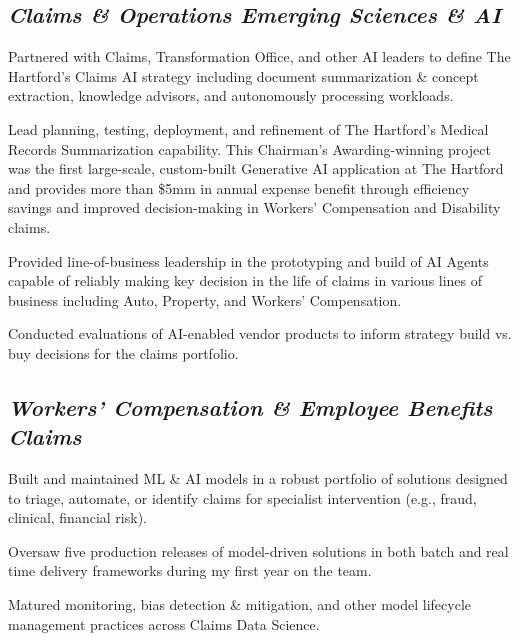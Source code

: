 \documentclass[letterpaper]{deedy-resume} %
\begin{document}
\begin{minipage}[t]{0.65\textwidth}
		\subsection{\emph{Claims \& Operations Emerging Sciences \& AI}}
			\hfill
			\hfill
			\begin{tightitemize}
				\item Partnered with Claims, Transformation Office, and other AI leaders to define The Hartford's Claims AI strategy including document summarization \& concept extraction, knowledge advisors, and autonomously processing workloads.
				\item Lead planning, testing, deployment, and refinement of The Hartford's Medical Records Summarization  capability.  This Chairman's Awarding-winning project was the first large-scale, custom-built Generative AI application at The Hartford and provides more than \$5mm in annual expense benefit through efficiency savings and improved decision-making in Workers' Compensation and Disability claims.
				\item Provided line-of-business leadership in the prototyping and build of AI Agents capable of reliably making key decision in the life of claims in various lines of business including Auto, Property, and Workers' Compensation.
				\item Conducted evaluations of AI-enabled vendor products to inform strategy build vs. buy decisions for the claims portfolio.
			\end{tightitemize}
		\sectionspace
		
		\subsection{\emph{Workers' Compensation \& Employee Benefits Claims}}
			\hfill
			\begin{tightitemize}
				\item Built and maintained ML \& AI models in a robust portfolio of solutions designed to triage, automate, or identify claims for specialist intervention (e.g., fraud, clinical, financial risk).
				\item Oversaw five production releases of model-driven solutions in both batch and real time delivery frameworks during my first year on the team.
				\item Matured monitoring, bias detection \& mitigation, and other model lifecycle management practices across Claims Data Science.
			\end{tightitemize}
\end{minipage}
\newpage
\end{document}
